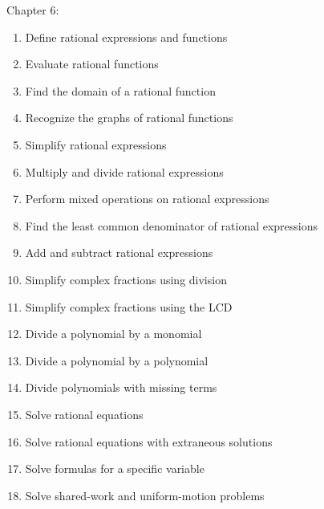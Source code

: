 \documentclass[11pt]{article}
\newenvironment{alphalist}{
  \begin{enumerate}[(1)]
    \addtolength{\itemsep}{-1.0\itemsep}}
  {\end{enumerate}}
\begin{document}
\noindent Chapter 6:
\begin{alphalist}
    \item Define rational expressions and functions
    \item Evaluate rational functions
    \item Find the domain of a rational function
    \item Recognize the graphs of rational functions
    \item Simplify rational expressions
    \item Multiply and divide rational expressions
    \item Perform mixed operations on rational expressions
    \item Find the least common denominator of rational expressions
    \item Add and subtract rational expressions
    \item Simplify complex fractions using division
    \item Simplify complex fractions using the LCD
    \item Divide a polynomial by a monomial
    \item Divide a polynomial by a polynomial
    \item Divide polynomials with missing terms 
    \item Solve rational equations
    \item Solve rational equations with extraneous solutions
    \item Solve formulas for a specific variable
    \item Solve shared-work and uniform-motion problems
\end{alphalist}
\end{document}
